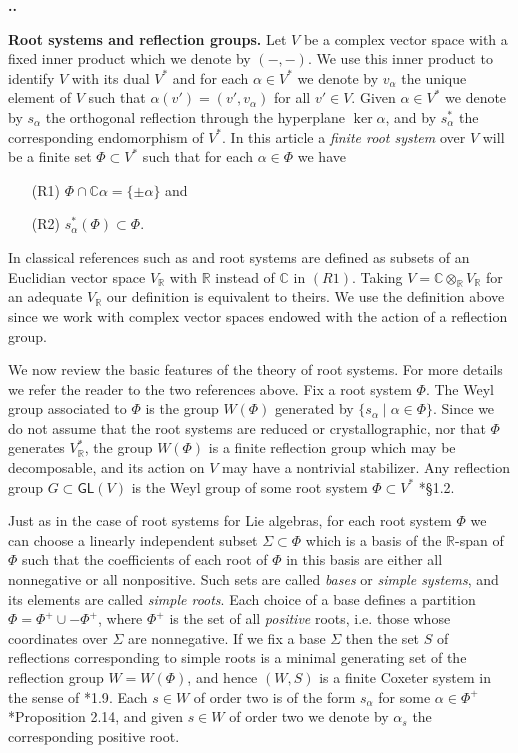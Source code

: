 \documentclass[11pt,fleqn]{amsart}
\renewcommand\thesection{\arabic{section}}
\newcounter{para}[section]
\renewcommand\thepara{\thesection.\arabic{para}}
\def\paragraph{%
 \noindent
 \refstepcounter{para}%
 \textbf{\thepara.}\hspace{1ex}%
}
\newcommand\about[1]{%
 {\bfseries#1.}%
}
\newcommand\CC{\mathbb C}
\newcommand\RR{\mathbb R}
\newcommand\ot{\otimes}
\begin{document}
\paragraph
\about{Root systems and reflection groups} Let $V$ be a complex vector space 
with a fixed inner product which we denote by $(-,-)$. We use this inner 
product to identify $V$ with its dual $V^*$ and for 
each $\alpha \in V^*$ we denote by $v_\alpha$ the unique element of $V$ such 
that $\alpha(v') = (v', v_\alpha)$ for all $v' \in V$. Given $\alpha \in V^*$ 
we denote by 
$s_\alpha$ the orthogonal reflection through the hyperplane $\ker \alpha$, and 
by $s_\alpha^*$ the corresponding endomorphism of $V^*$. In this article a
\emph{finite root system} over $V$ will be a finite set $\Phi \subset V^*$ 
such that for each $\alpha \in \Phi$ we have 
\begin{itemize}
\item[(R1)] $\Phi \cap \CC \alpha = \{\pm \alpha\}$ and
\item[(R2)] $s_\alpha^*(\Phi) \subset \Phi$.
\end{itemize}
In classical references such as \cite{Hump-coxeter-book} and 
\cite{Hiller-coxeter-book} root systems are defined as subsets of an Euclidian
vector space $V_\RR$ with $\RR$ instead of $\CC$ in $(R1)$. Taking $V = \CC 
\ot_\RR V_\RR$ for an adequate $V_\RR$ our definition is equivalent to theirs. 
We use the definition above since we work with complex vector spaces endowed 
with the action of a reflection group. 

We now review the basic features of the theory of root systems. For more 
details we refer the reader to the two references above. Fix a root system 
$\Phi$. The Weyl group associated to $\Phi$ is the group $W(\Phi)$ generated 
by $\{s_\alpha \mid \alpha \in \Phi\}$. Since we do not assume that the root 
systems are reduced or crystallographic, nor that $\Phi$ generates $V_\RR^*$,  
the group $W(\Phi)$ is a finite reflection group which may be 
decomposable, and its action on $V$ may have a nontrivial stabilizer. Any 
reflection group $G \subset \mathsf{GL}(V)$ is the Weyl group of some root 
system $\Phi \subset V^*$ \cite{Hiller-coxeter-book}*{\S 1.2}. 

Just as in the case of root systems for Lie algebras, for each root system 
$\Phi$ we can choose a linearly independent subset $\Sigma \subset \Phi$ which
is a basis of the $\RR$-span of $\Phi$ such that the coefficients of each root
of $\Phi$ in this basis are either all nonnegative or all nonpositive. Such 
sets are called \emph{bases} or \emph{simple systems}, and its elements are 
called \emph{simple roots}. Each choice of a base defines a partition $\Phi = 
\Phi^+ \cup - \Phi^+$, where $\Phi^+$ is the set of all \emph{positive} roots, 
i.e. those whose coordinates over $\Sigma$ are nonnegative. If we fix a base 
$\Sigma$ then the set $S$ of reflections corresponding to simple roots is a 
minimal generating set of the reflection group $W = W(\Phi)$, and hence $(W,S)$
is a finite Coxeter system in the sense of \cite{Hump-coxeter-book}*{1.9}. 
Each $s \in W$ of order two is of the form $s_\alpha$ for some $\alpha \in 
\Phi^+$ \cite{Hump-coxeter-book}*{Proposition 2.14}, and given $s \in W$ of 
order two we denote by $\alpha_s$ the corresponding positive root.
\end{document}
